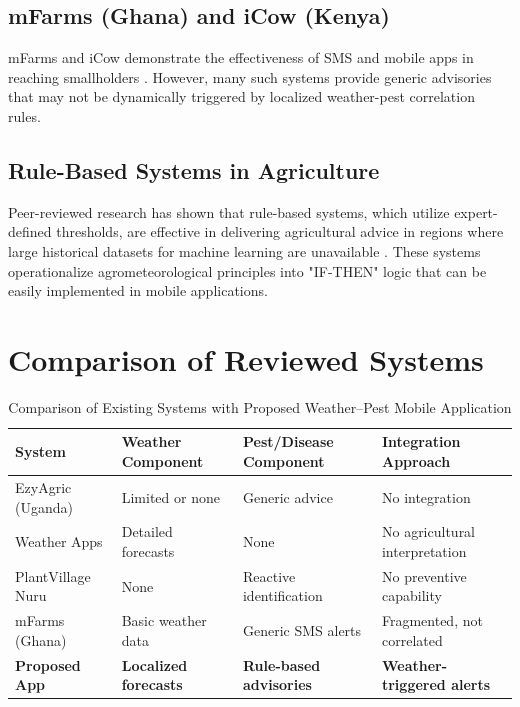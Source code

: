 \documentclass[12pt]{report}
\begin{document}
\subsection{mFarms (Ghana) and iCow (Kenya)}
mFarms and iCow demonstrate the effectiveness of SMS and mobile apps in reaching smallholders \cite{FAO2022, WorldBank2021}. However, many such systems provide generic advisories that may not be dynamically triggered by localized weather-pest correlation rules.

\subsection{Rule-Based Systems in Agriculture}
Peer-reviewed research has shown that rule-based systems, which utilize expert-defined thresholds, are effective in delivering agricultural advice in regions where large historical datasets for machine learning are unavailable \cite{Saini2012}. These systems operationalize agrometeorological principles into "IF-THEN" logic that can be easily implemented in mobile applications.

\section{Comparison of Reviewed Systems}
\begin{table}[h]
    \centering
    \caption{Comparison of Existing Systems with Proposed Weather--Pest Mobile Application}
    \begin{tabular}{|p{3cm}|p{3cm}|p{3cm}|p{3cm}|}
        \hline
        \textbf{System} & \textbf{Weather Component} & \textbf{Pest/Disease Component} & \textbf{Integration Approach} \\
        \hline
        EzyAgric (Uganda) & Limited or none & Generic advice & No integration \\
        \hline
        Weather Apps & Detailed forecasts & None & No agricultural interpretation \\
        \hline
        PlantVillage Nuru & None & Reactive identification & No preventive capability \\
        \hline
        mFarms (Ghana) & Basic weather data & Generic SMS alerts & Fragmented, not correlated \\
        \hline
        \textbf{Proposed App} & \textbf{Localized forecasts} & \textbf{Rule-based advisories} & \textbf{Weather-triggered alerts} \\
        \hline
    \end{tabular}
\end{table}
\end{document}
